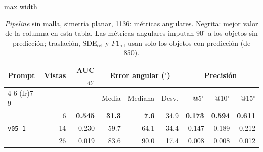 
\begin{table}[htbp]
\centering
\caption{\textit{Pipeline} sin malla, simetría planar, 1136: métricas angulares. Negrita: mejor valor de la columna en esta tabla. Las métricas angulares imputan $90^\circ$ a los objetos sin predicción; traslación, SDE$_{\mathrm{ref}}$ y $F1_{\mathrm{ref}}$ usan solo los objetos con predicción (de 850).}
\label{tab:plane_1136_angular}
\begin{adjustbox}{max width=\textwidth}
\begin{tabular}{lrrrrrrrr}
\toprule
\multirow{2}{*}{Prompt} & \multirow{2}{*}{Vistas} & \multirow{2}{*}{AUC$_{45^\circ}$} & \multicolumn{3}{c}{Error angular ($^\circ$)} & \multicolumn{3}{c}{Precisión} \\
\cmidrule(lr){4-6} \cmidrule(lr){7-9}
 &  &  & Media & Mediana & Desv. & @5$^\circ$ & @10$^\circ$ & @15$^\circ$ \\
\midrule
\multirow{3}{*}{\texttt{v05\_1}} & 6 & \textbf{0.545} & \textbf{31.3} & \textbf{7.6} & 34.9 & \textbf{0.173} & \textbf{0.594} & \textbf{0.611} \\
 & 14 & 0.230 & 59.7 & 64.1 & 34.4 & 0.147 & 0.189 & 0.212 \\
 & 26 & 0.019 & 83.6 & 90.0 & 17.4 & 0.008 & 0.008 & 0.012 \\
\bottomrule
\end{tabular}
\end{adjustbox}
\end{table}

